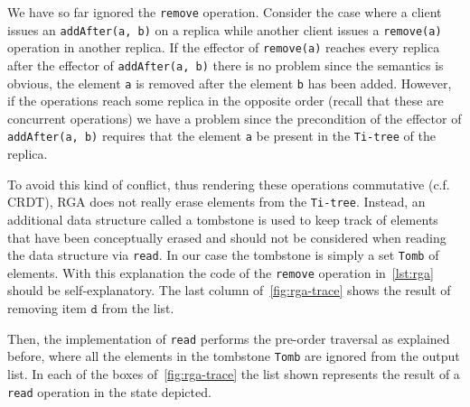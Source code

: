 
We have so far ignored the \lstinline|remove| operation.
%
Consider the case where a client issues an \lstinline|addAfter(a, b)|
on a replica while another client issues a \lstinline|remove(a)|
operation in another replica.
%
If the effector of \lstinline|remove(a)| reaches every replica after
the effector of \lstinline|addAfter(a, b)| there is no problem since
the semantics is obvious, the element \lstinline|a| is removed after
the element \lstinline|b| has been added.
%
However, if the operations reach some replica in the opposite order
(recall that these are concurrent operations) we have a problem since
the precondition of the effector of \lstinline|addAfter(a, b)|
requires that the element \lstinline|a| be present in the
\lstinline|Ti-tree| of the replica.

To avoid this kind of conflict, thus rendering these operations
commutative (c.f. CRDT), RGA does not really erase elements from the
\lstinline|Ti-tree|.
%
Instead, an additional data structure called a tombstone is used to
keep track of elements that have been conceptually erased and should
not be considered when reading the data structure via \lstinline|read|.
%
In our case the tombstone is simply a set \lstinline|Tomb| of
elements.
%
With this explanation the code of the \lstinline|remove| operation
in~\autoref{lst:rga} should be self-explanatory.
%
The last column of~\autoref{fig:rga-trace} shows the result of
removing item $\mathtt{d}$ from the list.

Then, the implementation of \lstinline|read| performs the pre-order
traversal as explained before, where all the elements in the tombstone
\lstinline|Tomb| are ignored from the output list.
%
In each of the boxes of~\autoref{fig:rga-trace} the list shown
represents the result of a \lstinline|read| operation in the state
depicted.



